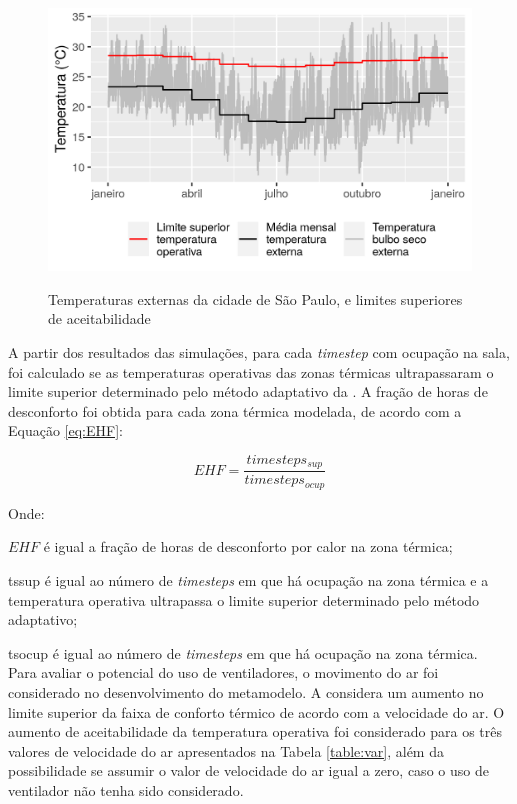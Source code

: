 \begin{figure}[h]
	\centering
	\caption{Temperaturas externas da cidade de São Paulo, e limites superiores de aceitabilidade}
	\includegraphics[width=.8\linewidth]{img/temp_means.png}
	\label{fig:temp_means}
\end{figure}

A partir dos resultados das simulações, para cada \textit{timestep} com ocupação na sala, foi calculado se as temperaturas operativas das zonas térmicas ultrapassaram o limite superior determinado pelo método adaptativo da . A fração de horas de desconforto foi obtida para cada zona térmica modelada, de acordo com a Equação \ref{eq:EHF}:

\begin{equation}
\label{eq:EHF}
EHF = \frac{timesteps_{sup}}{timesteps_{ocup}}
\end{equation}

Onde:

$EHF$ é igual a fração de horas de desconforto por calor na zona térmica;

\gls{tssup} é igual ao número de \textit{timesteps} em que há ocupação na zona térmica e a temperatura operativa ultrapassa o limite superior determinado pelo método adaptativo;

\gls{tsocup} é igual ao número de \textit{timesteps} em que há ocupação na zona térmica.
\\

Para avaliar o potencial do uso de ventiladores, o movimento do ar foi considerado no desenvolvimento do metamodelo.
A  considera um aumento no limite superior da faixa de conforto térmico de acordo com a velocidade do ar.
O aumento de aceitabilidade da temperatura operativa foi considerado para os três valores de velocidade do ar apresentados na Tabela \ref{table:var}, além da possibilidade se assumir o valor de velocidade do ar igual a zero, caso o uso de ventilador não tenha sido considerado.

